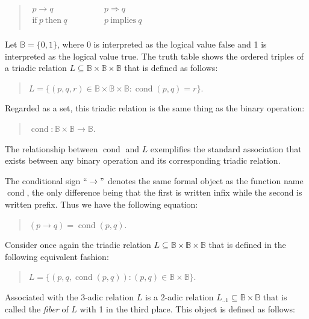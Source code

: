 \documentclass[12pt]{article}
\begin{document}
\begin{quote}$\begin{matrix}
p \rightarrow q                  & \quad & \quad & p \Rightarrow q        \\
\mathrm{if}\ p\ \mathrm{then}\ q & \quad & \quad & p\ \mathrm{implies}\ q \\
\end{matrix}$\end{quote}

Let $\mathbb{B} = \{ 0, 1 \}$, where 0 is interpreted as the logical value $\mathrm{false}$ and 1 is interpreted as the logical value $\mathrm{true}$.  The truth table shows the ordered triples of a triadic relation $L \subseteq \mathbb{B} \times \mathbb{B} \times \mathbb{B}$ that is defined as follows:

\begin{quote}
$L = \{ (p, q, r) \in \mathbb{B} \times \mathbb{B} \times \mathbb{B} : \operatorname{cond}(p, q) = r \}$.
\end{quote}

Regarded as a set, this triadic relation is the same thing as the binary operation:

\begin{quote}
$\operatorname{cond} : \mathbb{B} \times \mathbb{B} \to \mathbb{B}$.
\end{quote}

The relationship between $\operatorname{cond}$ and $L$ exemplifies the standard association that exists between any binary operation and its corresponding triadic relation.

The conditional sign $``\rightarrow"$ denotes the same formal object as the function name $\operatorname{cond}$, the only difference being that the first is written infix while the second is written prefix.  Thus we have the following equation:

\begin{quote}
$(p \rightarrow q) = \operatorname{cond}(p, q)$.
\end{quote}

Consider once again the triadic relation $L \subseteq \mathbb{B} \times \mathbb{B} \times \mathbb{B}$ that is defined in the following equivalent fashion:

\begin{quote}
$L = \{ (p, q, \operatorname{cond}(p, q)) : (p, q) \in \mathbb{B} \times \mathbb{B} \}$.
\end{quote}

Associated with the 3-adic relation $L$ is a 2-adic relation $L_{..1} \subseteq \mathbb{B} \times \mathbb{B}$ that is called the \textit{fiber} of $L$ with 1 in the third place.  This object is defined as follows:
\end{document}
